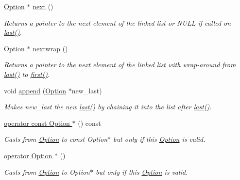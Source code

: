 \begin{DoxyCompactItemize}
\hyperlink{classoption_1_1Option}{Option} $\ast$ \hyperlink{classoption_1_1Option_a59ae9aed505f4d410633bb36478a32be}{next} ()
\begin{DoxyCompactList}\small\item\em Returns a pointer to the next element of the linked list or N\+U\+LL if called on \hyperlink{classoption_1_1Option_afe2aff68191e55b59c53fac3dbbcd7c3}{last()}. \end{DoxyCompactList}\item 
\hyperlink{classoption_1_1Option}{Option} $\ast$ \hyperlink{classoption_1_1Option_ae8d8c058af3c781cb1d444998df48fef}{nextwrap} ()
\begin{DoxyCompactList}\small\item\em Returns a pointer to the next element of the linked list with wrap-\/around from \hyperlink{classoption_1_1Option_afe2aff68191e55b59c53fac3dbbcd7c3}{last()} to \hyperlink{classoption_1_1Option_abb4e13cd7c90999c8a6b1f871cece283}{first()}. \end{DoxyCompactList}\item 
void \hyperlink{classoption_1_1Option_a59030822a1ec4e667e6c288d7e5ec961}{append} (\hyperlink{classoption_1_1Option}{Option} $\ast$new\+\_\+last)
\begin{DoxyCompactList}\small\item\em Makes {\ttfamily new\+\_\+last} the new \hyperlink{classoption_1_1Option_afe2aff68191e55b59c53fac3dbbcd7c3}{last()} by chaining it into the list after \hyperlink{classoption_1_1Option_afe2aff68191e55b59c53fac3dbbcd7c3}{last()}. \end{DoxyCompactList}\item 
\hyperlink{classoption_1_1Option_a3c0504baaa809c622d59c2c09f83e25b}{operator const Option $\ast$} () const
\begin{DoxyCompactList}\small\item\em Casts from \hyperlink{classoption_1_1Option}{Option} to const Option$\ast$ but only if this \hyperlink{classoption_1_1Option}{Option} is valid. \end{DoxyCompactList}\item 
\hyperlink{classoption_1_1Option_ac5b9235d79208035d97e41fe17ba04d6}{operator Option $\ast$} ()
\begin{DoxyCompactList}\small\item\em Casts from \hyperlink{classoption_1_1Option}{Option} to Option$\ast$ but only if this \hyperlink{classoption_1_1Option}{Option} is valid. \end{DoxyCompactList}\item 

\end{DoxyCompactItemize}
